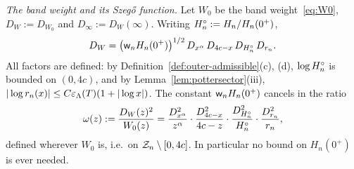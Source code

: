 \emph{The band weight and its Szeg\H{o} function.} Let $W_0$ be the band weight~\eqref{eq:W0}, $D_W:=D_{W_0}$ and
$D_\infty:=D_W(\infty)$. Writing $H^{\circ}_n:=H_n/H_n(0^+)$,
\begin{equation}\label{eq:DW-factor}
  D_W=\bigl(\mathsf w_n H_n(0^+)\bigr)^{1/2}\,D_{x^\alpha}\,D_{4c-x}\,D_{H^{\circ}_n}\,D_{r_n}.
\end{equation}
All factors are defined: by Definition~\ref{def:outer-admissible}(c), (d), $\log H^{\circ}_n$ is bounded on $(0,4c)$, and by
Lemma~\ref{lem:pottersector}(iii), $|\log r_n(x)|\le C\varepsilon_\Lambda(T)(1+|\log x|)$. The constant $\mathsf w_n H_n(0^+)$ cancels
in the ratio
\begin{equation}\label{eq:omega}
  \omega(z):=\frac{D_W(z)^2}{W_0(z)}
  =\frac{D_{x^\alpha}^2}{z^\alpha}\cdot\frac{D_{4c-x}^2}{4c-z}\cdot\frac{D_{H^{\circ}_n}^2}{H^{\circ}_n}\cdot\frac{D_{r_n}^2}{r_n},
\end{equation}
defined wherever $W_0$ is, i.e.\ on $\mathcal{Z}_n\setminus[0,4c]$. In particular no bound on $H_n(0^+)$ is ever needed.

